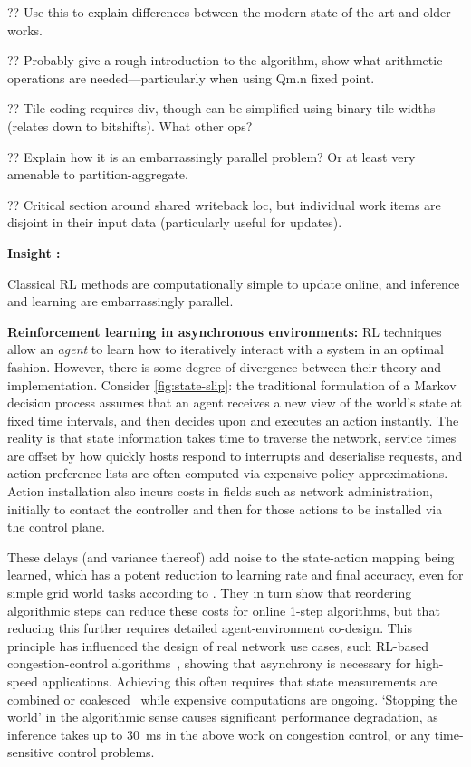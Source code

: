 \documentclass[sigconf,natbib=false]{acmart}
\newcommand{\fakepara}[1]{\noindent\textbf{#1:}}
\newcounter{insightc}
\newenvironment{insight}
	{
		\begin{tipblock}\refstepcounter{insightc}\textbf{Insight \theinsightc:}\em
	}
	{
		\end{tipblock}
	}
\begin{document}
?? Use this to explain differences between the modern state of the art and older works.

?? Probably give a rough introduction to the algorithm, show what arithmetic operations are needed---particularly when using Qm.n fixed point.

?? Tile coding requires div, though can be simplified using binary tile widths (relates down to bitshifts). What other ops?

?? Explain how it is an embarrassingly parallel problem? Or at least very amenable to partition-aggregate.

?? Critical section around shared writeback loc, but individual work items are disjoint in their input data (particularly useful for updates).

\begin{insight}
	Classical RL methods are computationally simple to update online, and inference and learning are embarrassingly parallel.
\end{insight}

\fakepara{Reinforcement learning in asynchronous environments}
RL techniques allow an \emph{agent} to learn how to iteratively interact with a system in an optimal fashion.
However, there is some degree of divergence between their theory and implementation.
Consider \cref{fig:state-slip}: the traditional formulation of a Markov decision process assumes that an agent receives a new view of the world's state at fixed time intervals, and then decides upon and executes an action instantly.
The reality is that state information takes time to traverse the network, service times are offset by how quickly hosts respond to interrupts and deserialise requests, and action preference lists are often computed via expensive policy approximations.
Action installation also incurs costs in fields such as network administration, initially to contact the controller and then for those actions to be installed via the control plane.

These delays (and variance thereof) add noise to the state-action mapping being learned, which has a potent reduction to learning rate and final accuracy, even for simple grid world tasks according to \textcite{DBLP:journals/firai/TravnikMSP18}.
They in turn show that reordering algorithmic steps can reduce these costs for online 1-step algorithms, but that reducing this further requires detailed agent-environment co-design.
This principle has influenced the design of real network use cases, such RL-based congestion-control algorithms~\parencite{DBLP:journals/corr/abs-1910-04054}, showing that asynchrony is necessary for high-speed applications.
Achieving this often requires that state measurements are combined or coalesced~\parencite{DBLP:journals/corr/abs-1910-04054,DBLP:journals/tnsm/SimpsonRP20} while expensive computations are ongoing.
`Stopping the world' in the algorithmic sense causes significant performance degradation, as inference takes up to \SI{30}{\milli\second} in the above work on congestion control, or any time-sensitive control problems.
\end{document}
